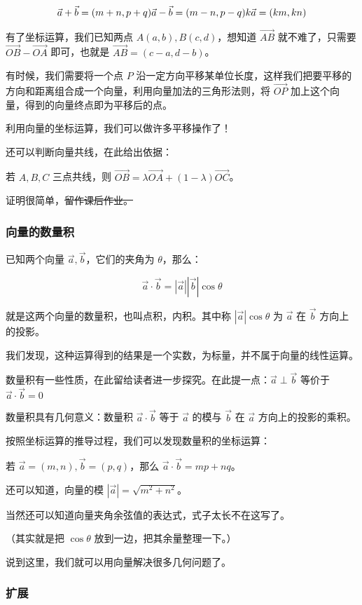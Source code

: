 $$
\vec a+\vec b=(m+n,p+q)\\
\vec a-\vec b=(m-n,p-q)\\
k\vec a=(km,kn)
$$

有了坐标运算，我们已知两点 $A(a,b),B(c,d)$，想知道 $\vec{AB}$ 就不难了，只需要 $\vec{OB}-\vec{OA}$ 即可，也就是 $\vec{AB}=(c-a,d-b)$。

有时候，我们需要将一个点 $P$ 沿一定方向平移某单位长度，这样我们把要平移的方向和距离组合成一个向量，利用向量加法的三角形法则，将 $\vec{OP}$ 加上这个向量，得到的向量终点即为平移后的点。

利用向量的坐标运算，我们可以做许多平移操作了！

还可以判断向量共线，在此给出依据：

若 $A,B,C$ 三点共线，则 $\vec{OB}=\lambda \vec{OA}+(1-\lambda)\vec{OC}$。

证明很简单，\sout{留作课后作业。}

\subsubsection{向量的数量积}

已知两个向量 $\vec a,\vec b$，它们的夹角为 $\theta$，那么：

$$
\vec a \cdot \vec b=|\vec a||\vec b|\cos \theta
$$

就是这两个向量的数量积，也叫点积，内积。其中称 $|\vec a|\cos \theta$ 为 $\vec a$ 在 $\vec b$ 方向上的投影。

我们发现，这种运算得到的结果是一个实数，为标量，并不属于向量的线性运算。

数量积有一些性质，在此留给读者进一步探究。在此提一点：$\vec a \perp \vec b$ 等价于 $\vec a\cdot \vec b=0$

数量积具有几何意义：数量积 $\vec a \cdot \vec b$ 等于 $\vec a$ 的模与 $\vec b$ 在 $\vec a$ 方向上的投影的乘积。

按照坐标运算的推导过程，我们可以发现数量积的坐标运算：

若 $\vec a=(m,n),\vec b=(p,q)$，那么 $\vec a\cdot \vec b=mp+nq$。

还可以知道，向量的模 $|\vec a|=\sqrt {m^2+n^2}$。

当然还可以知道向量夹角余弦值的表达式，式子太长不在这写了。

（其实就是把 $\cos \theta$ 放到一边，把其余量整理一下。）

说到这里，我们就可以用向量解决很多几何问题了。

\subsubsection{扩展}

